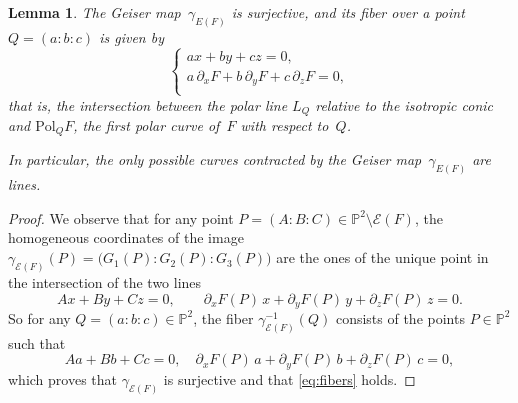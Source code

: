 \documentclass{amsart}
\theoremstyle{plain}
\newtheorem{lemma}{Lemma}[section]
\theoremstyle{definition}
\newcommand{\p}{\mathbb{P}}
\newcommand{\Bl}{\mathrm{Bl}}
\newcommand{\Eig}[1]{\mathcal{E}\!\left( {#1} \right)}
\begin{document}
\begin{lemma}
The Geiser map~$\gamma_{E(F)}$ is surjective, and its fiber over a point $Q = (a:b:c)$ is given by
%
\begin{equation}
\label{eq:fibers}
    \left\{
    \begin{array}{l}
    a x + by + cz = 0, \\[2pt]
    a \, \partial_x F + b \, \partial_y F + c \, \partial_z F = 0,\\
 \end{array}\right.
\end{equation}
%
that is, the intersection between the polar line $L_Q$ relative to the isotropic conic and $\mathrm{Pol}_Q F$, the
first polar curve of~$F$ with respect to~$Q$.

In particular, the only possible curves contracted by the Geiser map~$\gamma _{E(F)}$ are lines.
\end{lemma}

\begin{proof}
We observe that for any point $P=(A:B:C) \in \p^2 \setminus \Eig{F}$, the homogeneous coordinates
of the image $\gamma_{\Eig{F}}(P) = \bigl( G_1(P): G_2(P): G_3(P) \bigr)$ are the ones of the unique point in the intersection of the two lines
%
\[
  Ax + By+ Cz  = 0, \qquad
  \partial_x F(P) \, x + \partial_y F(P) \, y+ \partial_z F(P) \, z = 0.
\]
%
So for any $Q = (a:b:c) \in \p^2$, the fiber $\gamma_{\Eig{F}}^{-1}(Q)$ consists of the points $P \in \p^2$ such that
%
\begin{equation}
\label{eq:polars}
Aa + Bb+ Cc = 0, \quad
\partial_x F(P) \, a + \partial_y F(P) \, b + \partial_z F(P) \, c = 0,
\end{equation}
%
which proves that $\gamma_{\Eig{F}}$ is surjective and that \eqref{eq:fibers} holds.
\end{proof}
\end{document}
